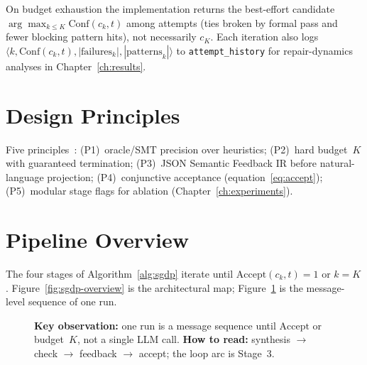 On budget exhaustion the implementation returns the best-effort candidate
$\arg\max_{k\le K}\mathrm{Conf}(c_k,t)$ among attempts (ties broken by formal
pass and fewer blocking pattern hits), not necessarily $c_K$.
Each iteration also logs
$\langle k, \mathrm{Conf}(c_k,t), |\text{failures}_k|, |\text{patterns}_k|\rangle$
to \texttt{attempt\_history} for repair-dynamics analyses in
Chapter~\ref{ch:results}.




\section{Design Principles}
\label{sec:method:principles}

Five principles~\citep{woodcock2009formalsurvey, chen2021codex}:
(P1)~oracle/SMT precision over heuristics;
(P2)~hard budget~$K$ with guaranteed termination;
(P3)~JSON Semantic Feedback IR before natural-language projection;
(P4)~conjunctive acceptance (equation~\eqref{eq:accept});
(P5)~modular stage flags for ablation (Chapter~\ref{ch:experiments}).

\section{Pipeline Overview}
\label{sec:method:overview}

The four stages of Algorithm~\ref{alg:sgdp} iterate until
$\mathrm{Accept}(c_k,t)=1$ or $k=K$.
Figure~\ref{fig:sgdp-overview} is the architectural map;
Figure~\ref{fig:pipeline-seq} is the message-level sequence of one run.

\begin{figure}[t]
  \centering
  \caption{\textbf{Key observation:} one run is a message sequence until
    $\mathrm{Accept}$ or budget~$K$, not a single LLM call.
    \textbf{How to read:} synthesis $\to$ check $\to$ feedback $\to$ accept;
    the loop arc is Stage~3.}
  \label{fig:pipeline-seq}
\end{figure}

